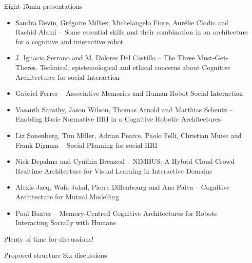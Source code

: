 \documentclass[compress]{beamer}
\begin{document}
\begin{frame}{Eight 15min presentations}
\footnotesize
    \begin{itemize}

\item Sandra Devin, Grégoire Milliez, Michelangelo Fiore, Aurélie Clodic and
    Rachid Alami -- {\Medium Some essential skills and their combination in an
    architecture for a cognitive and interactive robot}

\item J. Ignacio Serrano and M. Dolores Del Castillo -- {\Medium The Three
    Must-Get-Theres.  Technical, epistemological and ethical concerns about
    Cognitive Architectures for social Interaction}

\item Gabriel Ferrer -- {\Medium Associative Memories and Human-Robot Social
    Interaction}

\item Vasanth Sarathy, Jason Wilson, Thomas Arnold and Matthias Scheutz --
    {\Medium Enabling Basic Normative HRI in a Cognitive Robotic Architectures}

\item Liz Sonenberg, Tim Miller, Adrian Pearce, Paolo Felli, Christian Muise and
    Frank Dignum -- {\Medium Social Planning for social HRI}

    \item Nick Depalma and Cynthia Breazeal -- {\Medium NIMBUS: A Hybrid
        Cloud-Crowd Realtime Architecture for Visual Learning in Interactive
    Domains}

\item Alexis Jacq, Wafa Johal, Pierre Dillenbourg and Ana Paiva -- {\Medium
    Cognitive Architecture for Mutual Modelling}

\item Paul Baxter -- {\Medium Memory-Centred Cognitive Architectures for Robots
    Interacting Socially with Humans}

    \end{itemize}
\end{frame}

\begin{frame}[plain]{}
    \centering
    {\Medium Plenty of time for discussions!}
\end{frame}

\begin{frame}{Proposed structure}
    \centering
    {\Medium Six discussions}\par
    \par
    \par
    \par

\end{frame}
\end{document}
